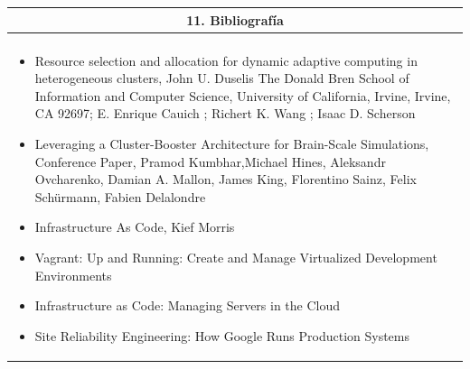 \documentclass[letter,12pt]{article}
\begin{document}
\begin{center}
\begin{tabular}{|p{15.5cm}|}
\hline
\multicolumn{1}{|c|}{ \textbf{11. Bibliografía}}\\
\hline
\\
\begin{itemize}
    \item Resource selection and allocation for dynamic adaptive computing in heterogeneous clusters, John U. Duselis The Donald Bren School of Information and Computer Science, University of California, Irvine, Irvine, CA 92697; E. Enrique Cauich ; Richert K. Wang ; Isaac D. Scherson
    \item Leveraging a Cluster-Booster Architecture for Brain-Scale Simulations, Conference Paper, Pramod Kumbhar,Michael Hines, Aleksandr Ovcharenko, Damian A. Mallon, James King, Florentino Sainz, Felix Schürmann, Fabien Delalondre
    \item Infrastructure As Code,  Kief Morris
    \item Vagrant: Up and Running: Create and Manage Virtualized Development Environments
    \item Infrastructure as Code: Managing Servers in the Cloud
    \item Site Reliability Engineering: How Google Runs Production Systems
    
\end{itemize}
\\
\hline
\end{tabular}
\end{center}
\end{document}
